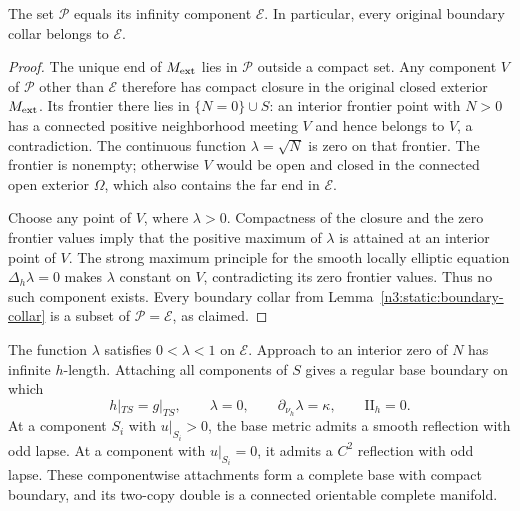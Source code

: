 \begin{lemma}
\label{n3:static:connected-positive-set}
The set $\mathcal P$ equals its infinity component $\mathcal E$.
In particular, every original boundary collar belongs to $\mathcal E$.
\end{lemma}

\begin{proof}
The unique end of $M_{\mathrm{ext}}$ lies in $\mathcal P$ outside a compact set.
Any component $V$ of $\mathcal P$ other than $\mathcal E$ therefore
has compact closure in the original closed exterior $M_{\mathrm{ext}}$.
Its frontier there lies in $\{N=0\}\cup S$: an interior frontier
point with $N>0$ has a connected positive neighborhood meeting $V$
and hence belongs to $V$, a contradiction. The continuous function
$\lambda=\sqrt N$ is zero on that frontier. The frontier is nonempty;
otherwise $V$ would be open and closed in the connected open exterior
$\Omega$, which also contains the far end in $\mathcal E$.

Choose any point of $V$, where $\lambda>0$. Compactness of the
closure and the zero frontier values imply that the positive maximum
of $\lambda$ is attained at an interior point of $V$. The strong
maximum principle for the smooth locally elliptic equation
$\Delta_h\lambda=0$ makes $\lambda$ constant on $V$, contradicting
its zero frontier values. Thus no such component exists.
Every boundary collar from Lemma~\ref{n3:static:boundary-collar} is a
subset of $\mathcal P=\mathcal E$, as claimed.
\end{proof}

\begin{lemma}
\label{n3:static:base-completion}
The function \(\lambda\) satisfies \(0<\lambda<1\) on \(\mathcal E\).
Approach to an interior zero of \(N\) has infinite \(h\)-length.
Attaching all components of $S$ gives a regular base boundary on which
\begin{equation}
\label{n3:static:base-boundary-data}
h|_{TS}=g|_{TS},\qquad
\lambda=0,\qquad
\partial_{\nu_h}\lambda=\kappa,\qquad
\mathrm{II}_h=0.
\end{equation}
At a component $S_i$ with $u|_{S_i}>0$, the base metric admits a
smooth reflection with odd lapse. At a component with $u|_{S_i}=0$,
it admits a $C^2$ reflection with odd lapse. These componentwise
attachments form a complete base with compact boundary, and its
two-copy double is a connected orientable complete manifold.
\end{lemma}

